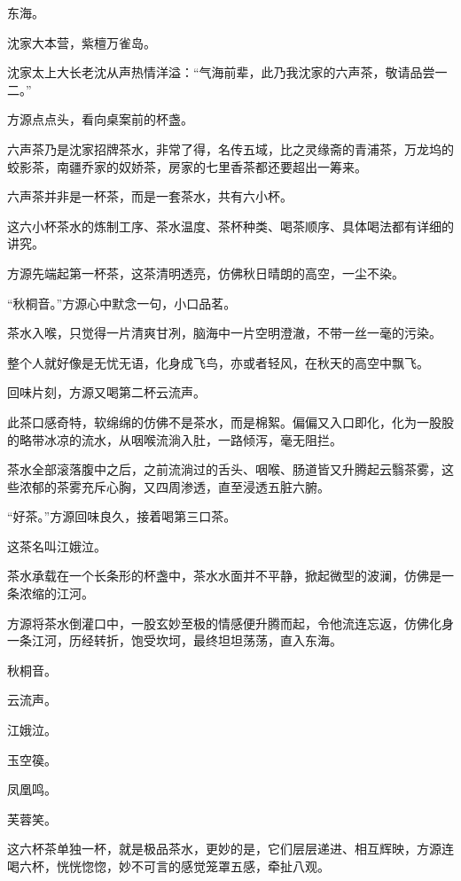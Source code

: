 
\begin{this_body}

东海。

沈家大本营，紫檀万雀岛。

沈家太上大长老沈从声热情洋溢：“气海前辈，此乃我沈家的六声茶，敬请品尝一二。”

方源点点头，看向桌案前的杯盏。

六声茶乃是沈家招牌茶水，非常了得，名传五域，比之灵缘斋的青浦茶，万龙坞的蛟影茶，南疆乔家的奴娇茶，房家的七里香茶都还要超出一筹来。

六声茶并非是一杯茶，而是一套茶水，共有六小杯。

这六小杯茶水的炼制工序、茶水温度、茶杯种类、喝茶顺序、具体喝法都有详细的讲究。

方源先端起第一杯茶，这茶清明透亮，仿佛秋日晴朗的高空，一尘不染。

“秋桐音。”方源心中默念一句，小口品茗。

茶水入喉，只觉得一片清爽甘冽，脑海中一片空明澄澈，不带一丝一毫的污染。

整个人就好像是无忧无语，化身成飞鸟，亦或者轻风，在秋天的高空中飘飞。

回味片刻，方源又喝第二杯云流声。

此茶口感奇特，软绵绵的仿佛不是茶水，而是棉絮。偏偏又入口即化，化为一股股的略带冰凉的流水，从咽喉流淌入肚，一路倾泻，毫无阻拦。

茶水全部滚落腹中之后，之前流淌过的舌头、咽喉、肠道皆又升腾起云翳茶雾，这些浓郁的茶雾充斥心胸，又四周渗透，直至浸透五脏六腑。

“好茶。”方源回味良久，接着喝第三口茶。

这茶名叫江娥泣。

茶水承载在一个长条形的杯盏中，茶水水面并不平静，掀起微型的波澜，仿佛是一条浓缩的江河。

方源将茶水倒灌口中，一股玄妙至极的情感便升腾而起，令他流连忘返，仿佛化身一条江河，历经转折，饱受坎坷，最终坦坦荡荡，直入东海。

秋桐音。

云流声。

江娥泣。

玉空篌。

凤凰鸣。

芙蓉笑。

这六杯茶单独一杯，就是极品茶水，更妙的是，它们层层递进、相互辉映，方源连喝六杯，恍恍惚惚，妙不可言的感觉笼罩五感，牵扯八观。


\end{this_body}
